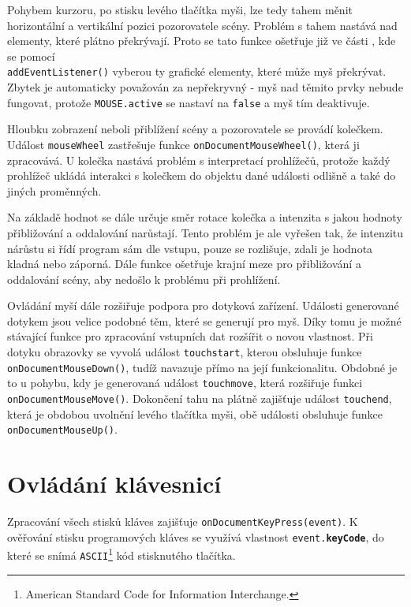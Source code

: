 Pohybem kurzoru, po stisku levého tlačítka myši, lze tedy tahem měnit horizontální a vertikální pozici pozorovatele scény. Problém s tahem nastává nad elementy, které plátno překrývají. Proto se tato funkce ošetřuje již ve části \texttt{\initProgram}, kde se pomocí \\\texttt{addEventListener()} vyberou ty grafické elementy, které může myš překrývat. Zbytek je automaticky považován za nepřekryvný - myš nad těmito prvky nebude fungovat, protože \texttt{MOUSE.active} se nastaví na  \texttt{false} a myš tím deaktivuje.


Hloubku zobrazení neboli přiblížení scény a pozorovatele se provádí kolečkem. Událost \texttt{mouseWheel} zastřešuje funkce \texttt{onDocumentMouseWheel()}, která ji zpracovává. U kolečka nastává problém s interpretací prohlížečů, protože každý prohlížeč ukládá interakci s kolečkem do objektu dané události odlišně a také do jiných proměnných. 


Na základě hodnot se dále určuje směr rotace kolečka a intenzita s jakou hodnoty přibližování a oddalování narůstají. Tento problém je ale vyřešen tak, že intenzitu nárůstu si řídí program sám dle vstupu, pouze se rozlišuje, zdali je hodnota kladná nebo záporná.
Dále funkce ošetřuje krajní meze pro přibližování a oddalování scény, aby nedošlo k problému při prohlížení.
 

Ovládání myší dále rozšiřuje podpora pro dotyková zařízení. Události generované dotykem jsou velice podobné těm, které se generují pro myš. Díky tomu je možné stávající funkce pro zpracování vstupních dat rozšířit o novou vlastnost. Při dotyku obrazovky se vyvolá událost \texttt{touchstart}, kterou obsluhuje funkce \texttt{onDocumentMouseDown()}, tudíž navazuje přímo na její funkcionalitu. Obdobné je to u pohybu, kdy je generovaná událost \texttt{touchmove}, která rozšiřuje funkci \texttt{onDocumentMouseMove()}. Dokončení tahu na plátně zajišťuje událost \texttt{touchend}, která je obdobou uvolnění levého tlačítka myši, obě události obsluhuje funkce \texttt{onDocumentMouseUp()}. 


\section{Ovládání klávesnicí}
Zpracování všech stisků kláves zajišťuje \texttt{onDocumentKeyPress(event)}. K ověřování stisku programových kláves se využívá vlastnost \texttt{event.\textbf{keyCode}}, do které se snímá \texttt{ASCII}\footnote{American Standard Code for Information Interchange.} kód stisknutého tlačítka.

